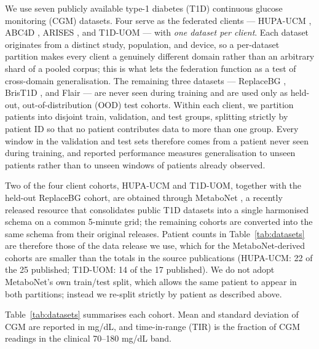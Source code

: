 \documentclass[10pt,letterpaper]{article}
\begin{document}
We use seven publicly available type-1 diabetes (T1D) continuous glucose
monitoring (CGM) datasets. Four serve as the federated clients --- HUPA-UCM
\cite{hidalgo2024hupaucm}, ABC4D \cite{abc4d_nct}, ARISES \cite{zhu2022arises},
and T1D-UOM \cite{alsuhaymi2025t1duom} --- with \emph{one dataset per client}. Each dataset
originates from a distinct study, population, and device, so a per-dataset
partition makes every client a genuinely different domain rather than an
arbitrary shard of a pooled corpus; this is what lets the federation function as
a test of cross-domain generalisation. The remaining three datasets ---
ReplaceBG \cite{aleppo2017replacebg}, BrisT1D \cite{james2025brist1d}, and Flair
\cite{jaeb_flair} --- are never seen
during training and are used only as held-out, out-of-distribution (OOD) test
cohorts. Within
each client, we partition patients
into disjoint train, validation, and test groups, splitting strictly by
patient ID so that no patient contributes data to more than one group. Every
window in the validation and test sets therefore comes from a patient never
seen during training, and reported performance measures generalisation to
unseen patients rather than to unseen windows of patients already observed.

Two of the four client cohorts, HUPA-UCM and T1D-UOM, together with the held-out
ReplaceBG cohort, are obtained through MetaboNet \cite{wolff2026metabonet}, a
recently released resource that consolidates public T1D datasets into a single
harmonised schema on a common 5-minute grid; the remaining cohorts are converted
into the same schema from their original releases. Patient counts in
Table~\ref{tab:datasets} are therefore those of the data release we use, which
for the MetaboNet-derived cohorts are smaller than the totals in the source
publications (HUPA-UCM: 22 of the 25 published; T1D-UOM: 14 of the 17
published). We do not adopt MetaboNet's own train/test split, which allows the
same patient to appear in both partitions; instead we re-split strictly by
patient as described above.

Table~\ref{tab:datasets} summarises each cohort. Mean and standard deviation of
CGM are reported in mg/dL, and time-in-range (TIR) is the fraction of CGM
readings in the clinical 70--180 mg/dL band.
\end{document}
